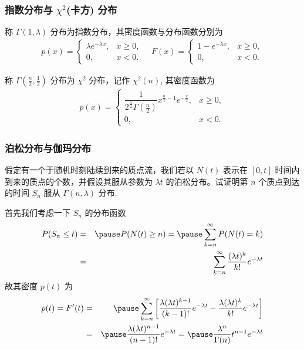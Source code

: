 \begin{frame}
	\frametitle{指数分布与 $\chi^2$(卡方) 分布}
	\begin{defi}
		称 $\Gamma (1,\lambda)$ 分布为指数分布，其密度函数与分布函数分别为
		\begin{eqnarray*}
			p(x)=\left\{
			\begin{array}{ll}
				\lambda e^{-\lambda x}, & x\ge 0, \\
				0,                      & x<0.
			\end{array}
			\right.\quad
			F(x)=\left\{
			\begin{array}{ll}
				1- e^{-\lambda x}, & x\ge 0, \\
				0,                 & x<0.
			\end{array}
			\right.
		\end{eqnarray*}

	\end{defi}
	\pause

	\begin{defi}
		称 $\Gamma (\frac{n}{2},\frac{1}{2})$ 分布为 $\chi^2$ 分布，记作 $\chi^2 (n)$, 其密度函数为
		\begin{eqnarray*}
			p(x)=\left\{
			\begin{array}{ll}
				\dfrac{1}{2^{\frac{n}{2}}\Gamma(\frac{n}{2})}x^{\frac{n}{2}-1}e^{-\frac{x}{2}}, & x\ge 0, \\
				0,                                                                              & x<0.
			\end{array}
			\right.
		\end{eqnarray*}

	\end{defi}
\end{frame}

\begin{frame}
	\frametitle{泊松分布与伽玛分布}
	\begin{exam}
		假定有一个于随机时刻陆续到来的质点流，我们若以 $N (t)$ 表示在 $[0,t]$ 时间内到来的质点的个数，并假设其服从参数为 $\lambda t$ 的泊松分布。试证明第 $n$ 个质点到达的时间 $S_n$ 服从 $\Gamma (n,\lambda)$ 分布.
	\end{exam}

	\pause
	\zheng 首先我们考虑一下 $S_n$ 的分布函数
	\begin{eqnarray*}
		P(S_n\le t)&=&\pause P(N(t)\ge n)=\pause \sum_{k=n}^\infty P(N(t)=k)\\
		&=&\sum_{k=n}^\infty \dfrac{(\lambda t)^k}{k!}e^{-\lambda t}
	\end{eqnarray*}
	\pause 故其密度 $p (t)$ 为
	\begin{eqnarray*}
		p(t)=F'(t)&=&\pause \sum_{k=n}^\infty\left[ \dfrac{\lambda(\lambda t)^{k-1}}{(k-1)!}e^{-\lambda t} - \dfrac{\lambda(\lambda t)^k}{k!}e^{-\lambda t}\right]\\
		&=& \pause \dfrac{\lambda(\lambda t)^{n-1}}{(n-1)!}e^{-\lambda t}=\pause \dfrac{\lambda^n}{\Gamma(n)}t^{n-1}e^{-\lambda t}
	\end{eqnarray*}

\end{frame}



% 

% 
% 
%  




